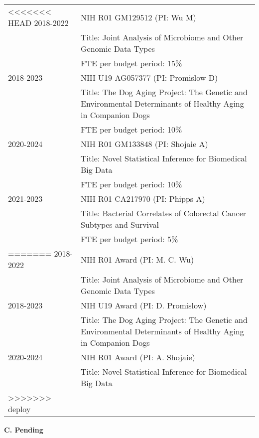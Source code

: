 \documentclass[10pt]{article}
\begin{document}
\begin{table}[H]
\hskip0.9cm\begin{tabular}{p{1.6cm}p{12cm}}
<<<<<<< HEAD
2018-2022 & NIH R01 GM129512 (PI: Wu M)  \\
& Title: Joint Analysis of Microbiome and Other Genomic Data Types\\
& FTE per budget period: 15\%\\
2018-2023 & NIH U19 AG057377 (PI: Promislow D) \\
& Title: The Dog Aging Project: The Genetic and Environmental Determinants of Healthy Aging in Companion Dogs\\
& FTE per budget period: 10\%\\
2020-2024 & NIH R01 GM133848 (PI: Shojaie A) \\
& Title: Novel Statistical Inference for Biomedical Big Data\\
& FTE per budget period: 10\%\\
2021-2023 &  NIH R01 CA217970 (PI: Phipps A)\\
&Title: Bacterial Correlates of Colorectal Cancer Subtypes and Survival\\
& FTE per budget period: 5\%\\
=======
2018-2022 & NIH R01 Award (PI: M. C. Wu)  \\
& Title: Joint Analysis of Microbiome and Other Genomic Data Types\\
2018-2023 & NIH U19 Award (PI: D. Promislow) \\
& Title: The Dog Aging Project: The Genetic and Environmental Determinants of Healthy Aging in Companion Dogs\\
2020-2024 & NIH R01 Award (PI: A. Shojaie) \\
& Title: Novel Statistical Inference for Biomedical Big Data\\
>>>>>>> deploy
\end{tabular}
\end{table}


\textbf{C. Pending}
\end{document}
